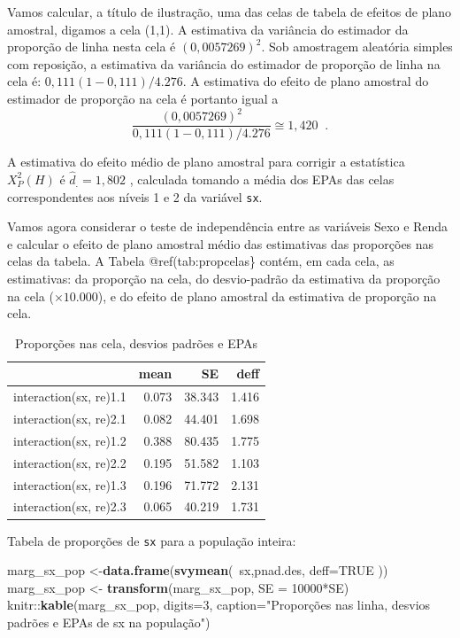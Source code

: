 \documentclass[]{book}
\newenvironment{Shaded}{\begin{snugshade}}{\end{snugshade}}
\newcommand{\KeywordTok}[1]{\textcolor[rgb]{0.13,0.29,0.53}{\textbf{{#1}}}}
\newcommand{\DataTypeTok}[1]{\textcolor[rgb]{0.13,0.29,0.53}{{#1}}}
\newcommand{\DecValTok}[1]{\textcolor[rgb]{0.00,0.00,0.81}{{#1}}}
\newcommand{\StringTok}[1]{\textcolor[rgb]{0.31,0.60,0.02}{{#1}}}
\newcommand{\OtherTok}[1]{\textcolor[rgb]{0.56,0.35,0.01}{{#1}}}
\newcommand{\NormalTok}[1]{{#1}}
\numberwithin{example}{chapter}
\numberwithin{remark}{chapter}
\numberwithin{definition}{chapter}
\begin{document}
Vamos calcular, a título de ilustração, uma das celas de tabela de
efeitos de plano amostral, digamos a cela (1,1). A estimativa da
variância do estimador da proporção de linha nesta cela é
\(\left( 0,0057269\right) ^{2}\). Sob amostragem aleatória simples com
reposição, a estimativa da variância do estimador de proporção de linha
na cela é: \(0,111\left( 1-0,111\right) /4.276\). A estimativa do efeito
de plano amostral do estimador de proporção na cela é portanto igual a
\[
\frac{\left( 0,0057269\right) ^{2}}{0,111\left( 1-0,111\right) /4.276}\cong
1,420\;\;. 
\]

A estimativa do efeito médio de plano amostral para corrigir a
estatística \(X_{P}^{2}\left( H\right)\) é \(\hat{d}_{.}=1,802\) ,
calculada tomando a média dos EPAs das celas correspondentes aos níveis
1 e 2 da variável \texttt{sx}.

Vamos agora considerar o teste de independência entre as variáveis Sexo
e Renda e calcular o efeito de plano amostral médio das estimativas das
proporções nas celas da tabela. A Tabela @ref(tab:propcelas\} contém, em
cada cela, as estimativas: da proporção na cela, do desvio-padrão da
estimativa da proporção na cela (\(\times 10.000\)), e do efeito de
plano amostral da estimativa de proporção na cela.

\begin{table}

\caption{\label{tab:propcelas}Proporções nas cela, desvios padrões e EPAs}
\centering
\begin{tabular}[t]{lrrr}
\toprule
  & mean & SE & deff\\
\midrule
interaction(sx, re)1.1 & 0.073 & 38.343 & 1.416\\
interaction(sx, re)2.1 & 0.082 & 44.401 & 1.698\\
interaction(sx, re)1.2 & 0.388 & 80.435 & 1.775\\
interaction(sx, re)2.2 & 0.195 & 51.582 & 1.103\\
interaction(sx, re)1.3 & 0.196 & 71.772 & 2.131\\
interaction(sx, re)2.3 & 0.065 & 40.219 & 1.731\\
\bottomrule
\end{tabular}
\end{table}

Tabela de proporções de \texttt{sx} para a população inteira:

\begin{Shaded}
\begin{Highlighting}[]
\NormalTok{marg_sx_pop <-}\KeywordTok{data.frame}\NormalTok{(}\KeywordTok{svymean}\NormalTok{(~sx,pnad.des, }\DataTypeTok{deff=}\OtherTok{TRUE} \NormalTok{))}
\NormalTok{marg_sx_pop <-}\StringTok{ }\KeywordTok{transform}\NormalTok{(marg_sx_pop, }\DataTypeTok{SE =} \DecValTok{10000}\NormalTok{*SE)}
\NormalTok{knitr::}\KeywordTok{kable}\NormalTok{(marg_sx_pop, }\DataTypeTok{digits=}\DecValTok{3}\NormalTok{,}
  \DataTypeTok{caption=}\StringTok{"Proporções nas linha, desvios padrões e EPAs de sx na população"}\NormalTok{)}
\end{Highlighting}
\end{Shaded}
\end{document}
